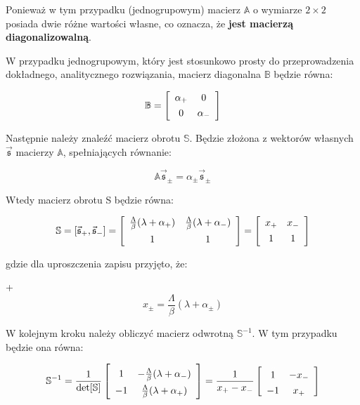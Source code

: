 	\noindent Ponieważ w tym przypadku (jednogrupowym) macierz $\mathbb{A}$ o wymiarze $2\times 2$ posiada dwie różne wartości własne, co oznacza, że \textbf{jest macierzą diagonalizowalną}.
	
	W przypadku jednogrupowym, który jest stosunkowo prosty do przeprowadzenia dokładnego, analitycznego rozwiązania, macierz diagonalna $\mathbb{B}$ będzie równa:
	
	\begin{equation}
		\mathbb{B}=\left[\begin{array}{cc}
			\alpha_+&0\\
			\uu{0}&\alpha_-
		\end{array}\right]
		\label{bee}
	\end{equation}
	
	\noindent Następnie należy znaleźć macierz obrotu $\mathbb{S}$. Będzie złożona z wektorów własnych $\vec{\mathfrak{s}}$ macierzy $\mathbb{A}$, spełniających równanie:
	
	\begin{equation}
		\mathbb{A}\vec{\mathfrak{s}}_{\pm}=\alpha_{\pm}\vec{\mathfrak{s}}_{\pm}
		\label{vecss}
	\end{equation}
	
	\noindent Wtedy macierz obrotu S będzie równa:
	
	\begin{equation}
		\mathbb{S}=[\vec{\mathfrak{s}}_+,\vec{\mathfrak{s}}_-]=
		\left[\begin{array}{cc}
			\frac{\Lambda}{\beta}(\lambda+\alpha_+)&\frac{\Lambda}{\beta}(\lambda+\alpha_-)\\
			\uu{1}&1
		\end{array}\right]=
		\left[\begin{array}{cc}
			x_+&x_-\\
			\uu{1}&1
		\end{array}\right]
		\label{svec}
	\end{equation}
	
	\noindent gdzie dla uproszczenia zapisu przyjęto, że:
	
+	\begin{equation}
		x_{\pm}=\frac{\Lambda}{\beta}(\lambda+\alpha_{\pm})
		\label{ixsde}
	\end{equation}
	
	\noindent W kolejnym kroku należy obliczyć macierz odwrotną $\mathbb{S}^{-1}$. W tym przypadku będzie ona równa:
	
	\begin{equation}
		\mathbb{S}^{-1}=\frac{1}{\det[\mathbb{S}]}
		\left[\begin{array}{cc}
			\uu{1}&-\frac{\Lambda}{\beta}(\lambda+\alpha_-)\\
			\uu{-1}&\frac{\Lambda}{\beta}(\lambda+\alpha_+)
		\end{array}\right]=\frac{1}{x_+-x_-}
		\left[\begin{array}{cc}
			\uu{1}&-x_-\\
			\uu{-1}&x_+
		\end{array}\right]
		\label{s-1}
	\end{equation}
	
